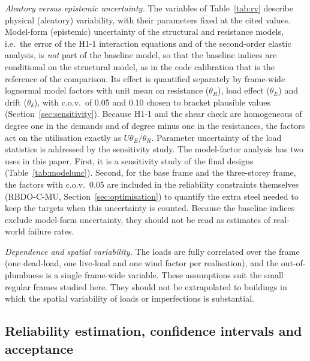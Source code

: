 \emph{Aleatory versus epistemic uncertainty.} The variables of Table~\ref{tab:rv} describe
physical (aleatory) variability, with their parameters fixed at the cited values. Model-form
(epistemic) uncertainty of the structural and resistance models, i.e.\ the error of the H1-1
interaction equations and of the second-order elastic analysis, is \emph{not} part of the
baseline model, so that the baseline indices are conditional on the structural model, as in the
code calibration that is the reference of the comparison. Its effect is quantified separately by
frame-wide lognormal model factors with unit mean on resistance ($\theta_R$), load effect
($\theta_E$) and drift ($\theta_\delta$), with c.o.v.\ of 0.05 and 0.10 chosen to bracket plausible
values (Section~\ref{sec:sensitivity}). Because H1-1 and the shear check are homogeneous of degree
one in the demands and of degree minus one in the resistances, the factors act on the
utilisation exactly as $U\theta_E/\theta_R$. Parameter uncertainty of the load statistics is
addressed by the sensitivity study. The model-factor analysis has two uses in this paper. First, it is a sensitivity study of the
final designs (Table~\ref{tab:modelunc}). Second, for the base frame and the three-storey frame, the
factors with c.o.v.\ 0.05 are included in the reliability constraints themselves (RBDO-C-MU,
Section~\ref{sec:optimisation}) to quantify the extra steel needed to keep the targets when this
uncertainty is counted. Because the baseline indices exclude model-form uncertainty, they
should not be read as estimates of real-world failure rates.

\emph{Dependence and spatial variability.} The loads are fully correlated over the frame (one
dead-load, one live-load and one wind factor per realisation), and the out-of-plumbness is a single
frame-wide variable. These assumptions suit the small regular frames studied here. They should not
be extrapolated to buildings in which the spatial variability of loads or imperfections is
substantial.

\begin{table}[!htbp]
\centering
\caption{Basic random variables (50-year reference period), source of each model, and which
parameters are assumptions of this study.}
\label{tab:rv}
\small
\fittable{}
\end{table}

\subsection{Reliability estimation, confidence intervals and acceptance}\label{sec:mc}

